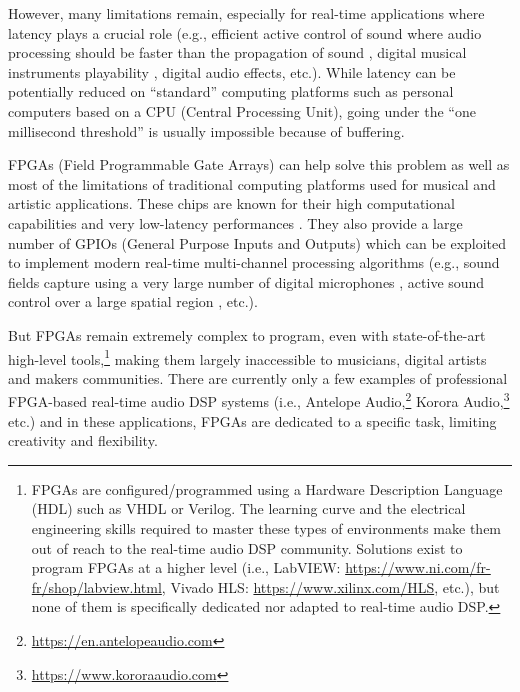 \documentclass[a4paper,9pt]{extarticle}
\begin{document}
However, many limitations remain, especially for real-time applications where latency plays a crucial role (e.g., efficient active control of sound where audio processing should be faster than the propagation of sound \cite{elliott2000signal}, digital musical instruments playability \cite{Lago2004}, digital audio effects, etc.). While latency can be potentially reduced on ``standard'' computing platforms such as personal computers based on a CPU (Central Processing Unit), going under the ``one millisecond threshold'' is usually impossible because of buffering.

FPGAs (Field Programmable Gate Arrays) can help solve this problem as well as most of the limitations of traditional computing platforms used for musical and artistic applications. These chips are known for their high computational capabilities \cite{Choi2013,Pfeifle2012} and very low-latency performances \cite{Verstraelen2014}. They also provide a large number of GPIOs (General Purpose Inputs and Outputs) which can be exploited to implement modern real-time multi-channel processing algorithms (e.g., sound fields capture using a very large number of digital microphones \cite{salze2019new}, active sound control over a large spatial region \cite{Zhang2018}, etc.). 

But FPGAs remain extremely complex to program, even with state-of-the-art high-level tools,\footnote{FPGAs are configured/programmed using a Hardware Description Language (HDL) such as VHDL or Verilog. The learning curve and the electrical engineering skills required to master these types of environments make them out of reach to the real-time audio DSP community. Solutions exist to program FPGAs at a higher level (i.e., LabVIEW: \url{https://www.ni.com/fr-fr/shop/labview.html}, Vivado HLS: \url{https://www.xilinx.com/HLS}, etc.), but none of them is specifically dedicated nor adapted to real-time audio DSP.} making them largely inaccessible to musicians, digital artists and makers communities.
There are currently only a few examples of professional FPGA-based real-time audio DSP systems (i.e., Antelope Audio,\footnote{\url{https://en.antelopeaudio.com}} Korora Audio,\footnote{\url{https://www.kororaaudio.com}} etc.) and in these applications, FPGAs are dedicated to a specific task, limiting creativity and flexibility.
\end{document}
